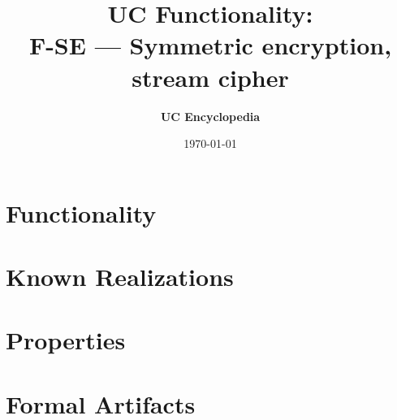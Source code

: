 \documentclass[11pt,a4paper]{article}
\title{\textbf{\Large UC Functionality:}\\[0.2em] \Large F-SE --- Symmetric encryption, stream cipher}
\author{\textbf{UC Encyclopedia}}
\date{\today}
\newtheorem{functionality}{Functionality}
\begin{document}
\maketitle

\begin{abstract}
\end{abstract}

\section{Functionality}

%

\section{Known Realizations}


\section{Properties}


\section{Formal Artifacts}

\end{document}
